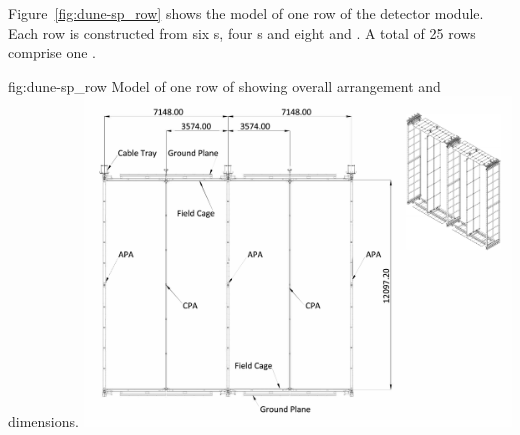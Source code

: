 Figure~\ref{fig:dune-sp_row} shows the model of one row of the
detector module. Each row is constructed from six s, four
s and eight  and . A total of 25 rows
comprise one .
\begin{dunefigure}{fig:dune-sp_row}
  {Model of one row of  showing overall arrangement and dimensions.}
  \includegraphics[width=0.85\textwidth]{graphics/Model_one_row_SP.pdf}
\end{dunefigure}


